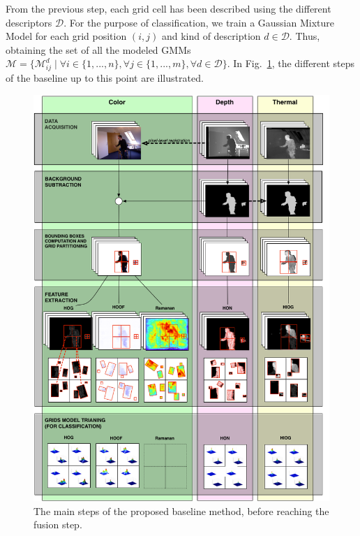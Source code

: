 \documentclass[10pt,twocolumn,letterpaper]{article}
\begin{document}
From the previous step, each grid cell has been described using the different descriptors $\mathcal{D}$. For the purpose of classification, we train a Gaussian Mixture Model for each grid position $(i,j)$ and kind of description $d \in \mathcal{D}$. Thus, obtaining the set of all the modeled GMMs $\mathcal{M} = \{\mathcal{M}_{ij}^{d} \;|\; \forall i \in \{1,...,n\}, \forall j \in \{1,...,m\}, \forall d \in \mathcal{D} \}$. In Fig.~\ref{fig:baseline}, the different steps of the baseline up to this point are illustrated.


\begin{figure}[ht!]
	\centering
	\includegraphics[width=\linewidth]{pictures/diagram.png}
	\caption{The main steps of the proposed baseline method, before reaching the fusion step.}
	\label{fig:baseline}
\end{figure}
\end{document}
